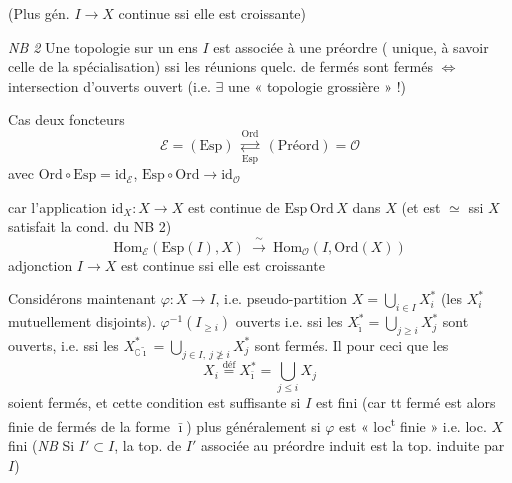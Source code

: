 \documentclass[11pt,a4paper]{article}
\begin{document}
(Plus gén. $I\to X$ continue ssi elle est croissante)

\emph{NB 2} Une topologie sur un ens $I$ est associée à une préordre ( unique, \struck{\ill{}} à savoir celle de la spécialisation) ssi les réunions quelc. de fermés sont fermés $\Longleftrightarrow$ \struck{\ill{}} intersection d'ouverts  ouvert (i.e. $\exists$ une « topologie grossière » !)

Cas  deux foncteurs
\[
\mathcal{E}=(\mathrm{Esp})\ \underset{\mathrm{Esp}}{\overset{\mathrm{Ord}}{\rightleftarrows}}\ (\mathrm{Préord})=\mathcal{O}
\]
avec $\mathrm{Ord}\circ\mathrm{Esp}=\mathrm{id}_{\mathcal{E}}$, $\mathrm{Esp}\circ\mathrm{Ord}\to\mathrm{id}_{\mathcal{O}}$

car l'application $\mathrm{id}_X:X\to X$ est continue de $\mathrm{Esp}\,\mathrm{Ord}\,X$ dans $X$ (et est $\simeq$ ssi $X$ satisfait la cond. du NB 2)
\[
\mathrm{Hom}_{\mathcal{E}}(\mathrm{Esp}(I),X)\ \xrightarrow{\ \sim\ }\ \mathrm{Hom}_{\mathcal{O}}(I,\mathrm{Ord}(X))
\]
adjonction
$I\to X$ est continue ssi elle est croissante



Considérons maintenant $\varphi:X\to I$, i.e.  pseudo-partition $X=\bigcup_{i\in I}X_i^{*}$ (les $X_i^{*}$ mutuellement disjoints).   $\varphi^{-1}(I_{\ge i})$ ouverts i.e. ssi les $X_{\tilde\imath}^{*}=\bigcup_{j\ge i}X_j^{*}$ sont ouverts, i.e. ssi les  $X_{\complement\tilde\imath}^{*}=\bigcup_{j\in I,\ j\not\ge i}X_j^{*}$ sont fermés. Il   pour ceci que les
\[
X_i\overset{\text{déf}}{=}X_{\bar\imath}^{*}=\bigcup_{j\le i}X_j
\]
soient fermés, et cette condition est suffisante si $I$ est fini (car tt fermé  est alors  finie de fermés de la forme $\bar\imath$) plus généralement si $\varphi$ est « loc\textsuperscript{t} finie » i.e. loc.  $X$ \ill{}  fini (\emph{NB} Si $I'\subset I$, la top. de $I'$ associée au préordre induit est la top. induite par $I$)
\end{document}
